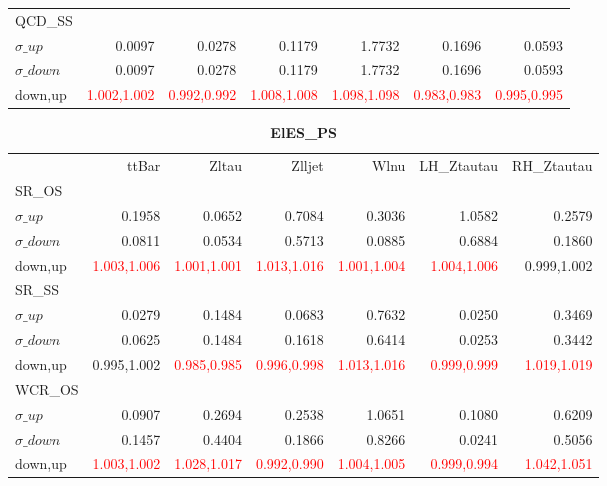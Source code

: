 \documentclass[11pt,oneside,a4paper]{article}
\begin{document}
\begin{table}
\begin{tabular}{lrrrrrr}
\hline
QCD\_SS &  &  &  &  &  &  \\
$\sigma\_up$ & 0.0097 & 0.0278 & 0.1179 & 1.7732 & 0.1696 & 0.0593 \\
$\sigma\_down$ & 0.0097 & 0.0278 & 0.1179 & 1.7732 & 0.1696 & 0.0593 \\
down,up & \textcolor{red}{1.002,1.002} & \textcolor{red}{0.992,0.992} & \textcolor{red}{1.008,1.008} & \textcolor{red}{1.098,1.098} & \textcolor{red}{0.983,0.983} & \textcolor{red}{0.995,0.995} \\

\hline
\end{tabular}
\end{table}
\begin{table}
\centering
\caption{\bf{ElES\_PS}}
\begin{tabular}{lrrrrrr}
 & ttBar & Zltau & Zlljet & Wlnu & LH\_Ztautau & RH\_Ztautau \\
SR\_OS &  &  &  &  &  &  \\
$\sigma\_up$ & 0.1958 & 0.0652 & 0.7084 & 0.3036 & 1.0582 & 0.2579 \\
$\sigma\_down$ & 0.0811 & 0.0534 & 0.5713 & 0.0885 & 0.6884 & 0.1860 \\
down,up & \textcolor{red}{1.003,1.006} & \textcolor{red}{1.001,1.001} & \textcolor{red}{1.013,1.016} & \textcolor{red}{1.001,1.004} & \textcolor{red}{1.004,1.006} & 0.999,1.002 \\

\hline
SR\_SS &  &  &  &  &  &  \\
$\sigma\_up$ & 0.0279 & 0.1484 & 0.0683 & 0.7632 & 0.0250 & 0.3469 \\
$\sigma\_down$ & 0.0625 & 0.1484 & 0.1618 & 0.6414 & 0.0253 & 0.3442 \\
down,up & 0.995,1.002 & \textcolor{red}{0.985,0.985} & \textcolor{red}{0.996,0.998} & \textcolor{red}{1.013,1.016} & \textcolor{red}{0.999,0.999} & \textcolor{red}{1.019,1.019} \\

\hline
WCR\_OS &  &  &  &  &  &  \\
$\sigma\_up$ & 0.0907 & 0.2694 & 0.2538 & 1.0651 & 0.1080 & 0.6209 \\
$\sigma\_down$ & 0.1457 & 0.4404 & 0.1866 & 0.8266 & 0.0241 & 0.5056 \\
down,up & \textcolor{red}{1.003,1.002} & \textcolor{red}{1.028,1.017} & \textcolor{red}{0.992,0.990} & \textcolor{red}{1.004,1.005} & \textcolor{red}{0.999,0.994} & \textcolor{red}{1.042,1.051} \\


\end{tabular}
\end{table}
\end{document}

